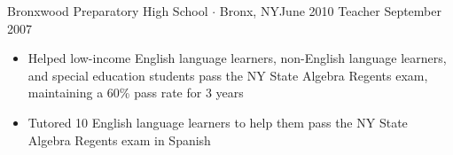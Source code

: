 \begin{experiences}
  \emptySeparator      

  \experience
  {Bronxwood Preparatory High School $\cdot$ Bronx, NY}{June 2010}
  {Teacher}
 {September 2007}   {
      \begin{itemize}
            \item Helped low-income English language learners, non-English language learners, and special education students pass the NY State Algebra Regents exam, maintaining a 60\% pass rate for 3 years 
            \item Tutored 10 English language learners to help them pass the NY State Algebra Regents exam in Spanish
      \end{itemize}
                  }
\end{experiences}
